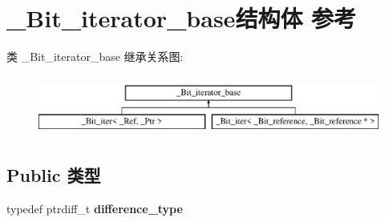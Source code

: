 \hypertarget{struct___bit__iterator__base}{}\section{\+\_\+\+Bit\+\_\+iterator\+\_\+base结构体 参考}
\label{struct___bit__iterator__base}
类 \+\_\+\+Bit\+\_\+iterator\+\_\+base 继承关系图\+:\begin{figure}[H]
\begin{center}
\leavevmode
\includegraphics[height=2.000000cm]{struct___bit__iterator__base}
\end{center}
\end{figure}
\subsection*{Public 类型}
\begin{DoxyCompactItemize}
\item 
\mbox{\label{struct___bit__iterator__base_a06cb62e1e127dc9188f143d2b78438d5}} 
typedef ptrdiff\+\_\+t {\bfseries difference\+\_\+type}
\end{DoxyCompactItemize}
